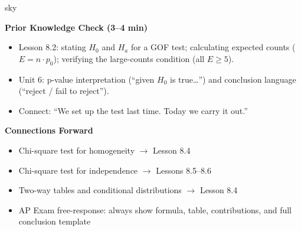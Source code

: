 \documentclass[10pt]{article}
\begin{document}
\begin{skillbox}{sky}
\begin{minipage}[t]{0.48\linewidth}
    \textbf{Prior Knowledge Check (3--4 min)}
    \begin{itemize}
        \item Lesson 8.2: stating $H_0$ and $H_a$ for a GOF test;
              calculating expected counts ($E = n \cdot p_0$);
              verifying the large-counts condition (all $E \ge 5$).
        \item Unit 6: p-value interpretation (``given $H_0$ is true\ldots'')
              and conclusion language (``reject / fail to reject'').
        \item Connect: ``We set up the test last time. Today we carry it out.''
    \end{itemize}
\end{minipage}
\hfill
\begin{minipage}[t]{0.48\linewidth}
    \textbf{Connections Forward}
    \begin{itemize}
        \item Chi-square test for homogeneity $\to$ Lesson 8.4
        \item Chi-square test for independence $\to$ Lessons 8.5--8.6
        \item Two-way tables and conditional distributions $\to$ Lesson 8.4
        \item AP Exam free-response: always show formula, table, contributions,
              and full conclusion template
    \end{itemize}
\end{minipage}
\end{skillbox}
\end{document}
